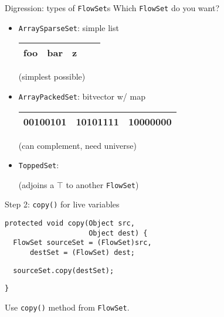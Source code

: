 \begin{slide}{Digression: types of {\tt FlowSet}s}
\vspace*{-0.1in}
Which {\tt FlowSet} do you want?
\begin{itemize}
\item {\tt ArraySparseSet}: simple list

\qquad \begin{tabular}{|c|c|c|c|c|} \hline
foo & bar & z & \\ \hline
\end{tabular}

(simplest possible)


\item {\tt ArrayPackedSet}: bitvector w/ map

\qquad \begin{tabular}{|c|c|c|} \hline
00100101 & 10101111 & 10000000 \\ \hline
\end{tabular}

(can complement, need universe)

\item {\tt ToppedSet}: 


(adjoins a $\top$ to another {\tt FlowSet})

\end{itemize}
\end{slide}

\begin{slide}{Step 2: {\tt copy()} for live variables}
\begin{verbatim}
protected void copy(Object src, 
                    Object dest) {
  FlowSet sourceSet = (FlowSet)src,
      destSet = (FlowSet) dest;

\end{verbatim}    
{\red\verb+  sourceSet.copy(destSet);+}
\begin{verbatim}
}
\end{verbatim}

\qquad

Use {\tt copy()} method from {\tt FlowSet}.
\end{slide}

